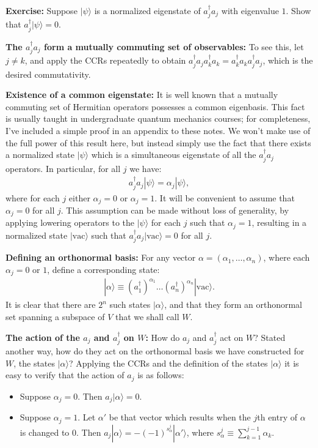 \documentclass[12pt]{article}
\begin{document}
\textbf{Exercise:} Suppose $|\psi\rangle$ is a normalized eigenstate
of $a_j^\dagger a_j$ with eigenvalue $1$.  Show that $a_j^\dagger
|\psi\rangle = 0$.

\textbf{The $a_j^\dagger a_j$ form a mutually commuting set of
  observables:} To see this, let $j \neq k$, and apply the CCRs
repeatedly to obtain $a_j^\dagger a_j a_k^\dagger a_k = a_k^\dagger
a_k a_j^\dagger a_j$, which is the desired commutativity.

\textbf{Existence of a common eigenstate:} It is well known that a
mutually commuting set of Hermitian operators possesses a common
eigenbasis.  This fact is usually taught in undergraduate quantum
mechanics courses; for completeness, I've included a simple proof in
an appendix to these notes.  We won't make use of the full power of
this result here, but instead simply use the fact that there exists a
normalized state $|\psi\rangle$ which is a simultaneous eigenstate of
all the $a_j^\dagger a_j$ operators.  In particular, for all $j$ we
have:
\begin{eqnarray}
  a_j^\dagger a_j |\psi\rangle = \alpha_j |\psi\rangle,
\end{eqnarray}
where for each $j$ either $\alpha_j = 0$ or $\alpha_j = 1$.  It will
be convenient to assume that $\alpha_j = 0$ for all $j$.  This
assumption can be made without loss of generality, by applying
lowering operators to the $|\psi\rangle$ for each $j$ such that
$\alpha_j = 1$, resulting in a normalized state $|\mbox{vac}\rangle$
such that $a_j^\dagger a_j |\mbox{vac}\rangle = 0$ for all $j$.

\textbf{Defining an orthonormal basis:} For any vector $\alpha =
(\alpha_1,\ldots,\alpha_n)$, where each $\alpha_j = 0$ or $1$, define
a corresponding state:
\begin{eqnarray}
  |\alpha \rangle \equiv (a_1^\dagger)^{\alpha_1} \ldots (a_n^\dagger)^{\alpha_n}|\mbox{vac}\rangle.
\end{eqnarray}
It is clear that there are $2^n$ such states $|\alpha\rangle$, and
that they form an orthonormal set spanning a subspace of $V$ that we
shall call $W$.

\textbf{The action of the $a_j$ and $a_j^\dagger$ on $W$:} How do
$a_j$ and $a_j^\dagger$ act on $W$?  Stated another way, how do they
act on the orthonormal basis we have constructed for $W$, the states
$|\alpha\rangle$?  Applying the CCRs and the definition of the states
$|\alpha\rangle$ it is easy to verify that the action of $a_j$ is as
follows:
\begin{itemize}
\item Suppose $\alpha_j = 0$.  Then $a_j|\alpha\rangle = 0$.
  
\item Suppose $\alpha_j = 1$.  Let $\alpha'$ be that vector which
  results when the $j$th entry of $\alpha$ is changed to $0$.  Then
  $a_j|\alpha\rangle = -(-1)^{s_\alpha^j} |\alpha'\rangle$, where
  $s_\alpha^j \equiv \sum_{k=1}^{j-1} \alpha_k$.
\end{itemize}
\end{document}
